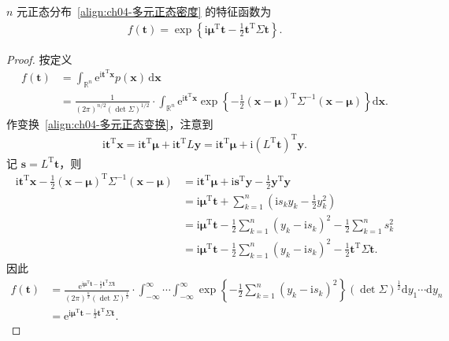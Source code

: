 \documentclass[../../main.tex]{subfiles}
\begin{document}
\begin{theorem}[多元正态的特征函数]\label{theorem:ch04-多元正态特征函数}
$n$ 元正态分布~\eqref{align:ch04-多元正态密度} 的特征函数为
\begin{align}
f(\boldsymbol{t})=\exp\left\{\mathrm{i}\boldsymbol{\mu}^{\mathrm{T}}\boldsymbol{t}-\frac12\boldsymbol{t}^{\mathrm{T}}\Sigma\boldsymbol{t}\right\}.\label{align:ch04-多元正态特征函数}
\end{align}
\end{theorem}

\begin{proof}
按定义
\begin{align*}
f(\boldsymbol{t})&=\int_{\mathbb{R}^n}\mathrm{e}^{\mathrm{i}\boldsymbol{t}^{\mathrm{T}}\boldsymbol{x}}p(\boldsymbol{x})\,\mathrm{d}\boldsymbol{x}\\
&=\frac{1}{(2\pi)^{n/2}(\det\Sigma)^{1/2}}
\cdot\int_{\mathbb{R}^n}\mathrm{e}^{\mathrm{i}\boldsymbol{t}^{\mathrm{T}}\boldsymbol{x}}\exp\left\{-\frac12(\boldsymbol{x}-\boldsymbol{\mu})^{\mathrm{T}}\Sigma^{-1}(\boldsymbol{x}-\boldsymbol{\mu})\right\}\mathrm{d}\boldsymbol{x}.
\end{align*}
作变换~\eqref{align:ch04-多元正态变换}，注意到
\begin{align}
\mathrm{i}\boldsymbol{t}^{\mathrm{T}}\boldsymbol{x}=\mathrm{i}\boldsymbol{t}^{\mathrm{T}}\boldsymbol{\mu}+\mathrm{i}\boldsymbol{t}^{\mathrm{T}}L\boldsymbol{y}=\mathrm{i}\boldsymbol{t}^{\mathrm{T}}\boldsymbol{\mu}+\mathrm{i}(L^{\mathrm{T}}\boldsymbol{t})^{\mathrm{T}}\boldsymbol{y}.\label{align:ch04-特征函数化简}
\end{align}
记 $\boldsymbol{s}=L^{\mathrm{T}}\boldsymbol{t}$，则
\begin{align*}
\mathrm{i}\boldsymbol{t}^{\mathrm{T}}\boldsymbol{x}-\frac12(\boldsymbol{x}-\boldsymbol{\mu})^{\mathrm{T}}\Sigma^{-1}(\boldsymbol{x}-\boldsymbol{\mu})
&=\mathrm{i}\boldsymbol{t}^{\mathrm{T}}\boldsymbol{\mu}+\mathrm{i}\boldsymbol{s}^{\mathrm{T}}\boldsymbol{y}-\frac12\boldsymbol{y}^{\mathrm{T}}\boldsymbol{y}\\
&=\mathrm{i}\boldsymbol{\mu}^{\mathrm{T}}\boldsymbol{t}+\sum_{k=1}^n\left(\mathrm{i}s_k y_k-\frac12 y_k^2\right)\\
&=\mathrm{i}\boldsymbol{\mu}^{\mathrm{T}}\boldsymbol{t}-\frac12\sum_{k=1}^n(y_k-\mathrm{i}s_k)^2-\frac12\sum_{k=1}^n s_k^2\\
&=\mathrm{i}\boldsymbol{\mu}^{\mathrm{T}}\boldsymbol{t}-\frac12\sum_{k=1}^n(y_k-\mathrm{i}s_k)^2-\frac12\boldsymbol{t}^{\mathrm{T}}\Sigma\boldsymbol{t}.
\end{align*}
因此
\begin{align*}
f(\boldsymbol{t})
&=\frac{\mathrm{e}^{\mathrm{i}\boldsymbol{\mu}^{\mathrm{T}}\boldsymbol{t}-\frac12\boldsymbol{t}^{\mathrm{T}}\Sigma\boldsymbol{t}}}{(2\pi)^{\frac{n}{2}}(\det\Sigma)^{\frac12}}
\cdot\int_{-\infty}^{\infty}\cdots\int_{-\infty}^{\infty}\exp\left\{-\frac12\sum_{k=1}^n(y_k-\mathrm{i}s_k)^2\right\}(\det\Sigma)^{\frac12}\mathrm{d}y_1\cdots\mathrm{d}y_n\\
&=\mathrm{e}^{\mathrm{i}\boldsymbol{\mu}^{\mathrm{T}}\boldsymbol{t}-\frac12\boldsymbol{t}^{\mathrm{T}}\Sigma\boldsymbol{t}}.
\end{align*}
\end{proof}
\end{document}
